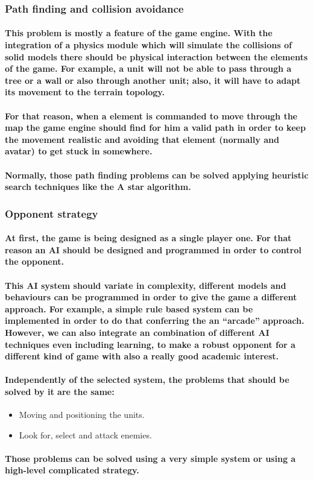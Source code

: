 \documentclass[a4paper,10pt]{article}
\newcommand{\p}[1]{\paragraph{\indent\textnormal{#1}}}
\begin{document}
   \subsubsection{Path finding and collision avoidance}

    \p{This problem is mostly a feature of the game engine. With the integration of a physics module which will simulate the collisions of solid models there should be physical interaction between the elements of the game. For example, a unit will not be able to pass through a tree or a wall or also through another unit; also, it will have to adapt its movement to the terrain topology.}

    \p{For that reason, when a element is commanded to move through the map the game engine should find for him a valid path in order to keep the movement realistic and avoiding that element (normally and avatar) to get stuck in somewhere.}

    \p{Normally, those path finding problems can be solved applying heuristic search techniques like the A star algorithm.}

   \subsubsection{Opponent strategy}

    \p{At first, the game is being designed as a single player one. For that reason an AI should be designed and programmed in order to control the opponent.}

    \p{This AI system should variate in complexity, different models and behaviours can be programmed in order to give the game a different approach. For example, a simple rule based system can be implemented in order to do that conferring the an ``arcade'' approach. However, we can also integrate an combination of different AI techniques even including learning, to make a robust opponent for a different kind of game with also a really good academic interest.}

    \p{Independently of the selected system, the problems that should be solved by it are the same:}

    \begin{itemize}
     \item Moving and positioning the units.
     \item Look for, select and attack enemies.
    \end{itemize}
  
    \p{Those problems can be solved using a very simple system or using a high-level complicated strategy.}
\end{document}
